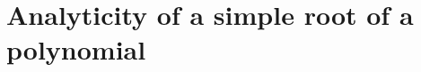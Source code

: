 \documentclass[a4paper,11pt]{article}
\newcommand{\udl}{\underline{\lambda}}
\newtheorem{lemma}{Lemma}[section]
\theoremstyle{remark}
\begin{document}
% 
% 
\renewcommand\thetheorem{\Alph{theorem}}
\section{Analyticity of a simple root of a polynomial}
\end{document}
